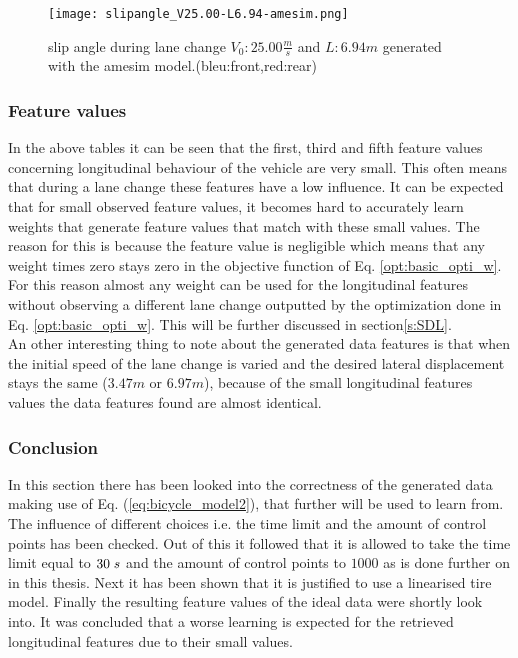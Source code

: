  \begin{figure}[h!]
	\centering
	\texttt{[image: slipangle\_V25.00-L6.94-amesim.png]}
	\caption{slip angle during lane change $V_0: 25.00 \frac{m}{s}$ and $L:6.94 m$ generated with the amesim model.(bleu:front,red:rear)}
	\label{fig:slip}
\end{figure}


\subsubsection{Feature values} \label{s:fv_val}
In the above tables it can be seen that the first, third and fifth feature values concerning longitudinal behaviour of the vehicle are very small. This often means that during a lane change these features have a low influence. It can be expected that for small observed feature values, it becomes hard to accurately learn weights that generate feature values that match with these small values. The reason for this is because the feature value is negligible which means that any weight times zero stays zero in the objective function of Eq. \ref{opt:basic_opti_w}. For this reason almost any weight can be used for the longitudinal features without observing a different lane change outputted by the optimization done in Eq. \ref{opt:basic_opti_w}. This will be further discussed in section\ref{s:SDL}.\\%

An other interesting thing to note about the generated data features is that when the initial speed of the lane change is varied and the desired lateral displacement stays the same ($3.47m$ or $6.97m$), because of the small longitudinal features values the data features found are almost identical. 

\subsubsection{Conclusion}
In this section there has been looked into the correctness of the generated data making use of Eq. (\ref{eq:bicycle_model2}), that further will be used to learn from. The influence of different choices i.e. the time limit and the amount of control points has been checked. Out of this it followed that it is allowed to take the time limit equal to $30 \hspace{1mm}s$ and the amount of control points to $1000$ as is done further on in this thesis. Next it has been shown that it is justified to use a linearised tire model. Finally the resulting feature values of the ideal data were shortly look into. It was concluded that a worse learning is expected for the retrieved longitudinal features due to their small values. 

